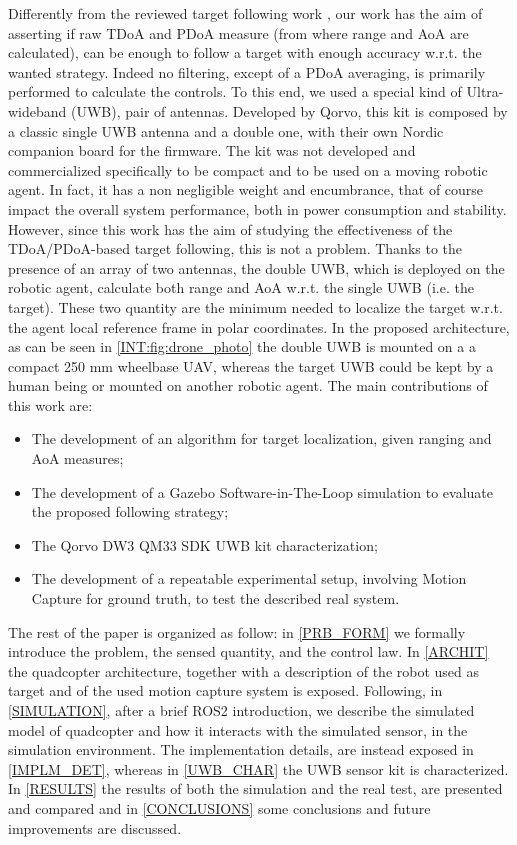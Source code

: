Differently from the reviewed target following work \cite{Uwbbasedsol,sidebyside}, our work has the aim of asserting if raw TDoA and PDoA measure (from where range and AoA are calculated), can be enough to follow a target with enough accuracy w.r.t. the wanted strategy. Indeed no filtering, except of a PDoA averaging, is primarily performed to calculate the controls. To this end, we used a special kind of Ultra-wideband (UWB), pair of antennas. Developed by Qorvo, this kit is composed by a classic single UWB antenna and a double one, with their own Nordic companion board for the firmware. The kit was not developed and commercialized specifically to be compact and to be used on a moving robotic agent. In fact, it has a non negligible weight and encumbrance, that of course impact the overall system performance, both in power consumption and stability. However, since this work has the aim of studying the effectiveness of the TDoA/PDoA-based target following, this is not a problem. Thanks to the presence of an array of two antennas, the double UWB, which is deployed on the robotic agent, calculate both range and AoA w.r.t. the single UWB (i.e. the target). These two quantity are the minimum needed to localize the target w.r.t. the agent local reference frame in polar coordinates. In the proposed architecture, as can be seen in \autoref{INT:fig:drone_photo} the double UWB is mounted on a a compact 250 mm wheelbase UAV, whereas the target UWB could be kept by a human being or mounted on another robotic agent. The main contributions of this work are:
\begin{itemize}
    \item The development of an algorithm for target localization, given ranging and AoA measures;
    \item The development of a Gazebo Software-in-The-Loop simulation to evaluate the proposed following strategy;
    \item The Qorvo DW3 QM33 SDK UWB kit characterization;
    \item The development of a repeatable experimental setup, involving Motion Capture for ground truth, to test the described real system.
\end{itemize}
The rest of the paper is organized as follow: in \autoref{PRB_FORM} we formally introduce the problem, the sensed quantity, and the control law. In \autoref{ARCHIT} the quadcopter architecture, together with a description of the robot used as target and of the used motion capture system is exposed. Following, in \autoref{SIMULATION}, after a brief ROS2 introduction, we describe the simulated model of quadcopter and how it interacts with the simulated sensor, in the simulation environment. The implementation details, are instead exposed in \autoref{IMPLM_DET}, whereas in \autoref{UWB_CHAR} the UWB sensor kit is characterized. In \autoref{RESULTS} the results of both the simulation and the real test, are presented and compared and in \autoref{CONCLUSIONS} some conclusions and future improvements are discussed.

